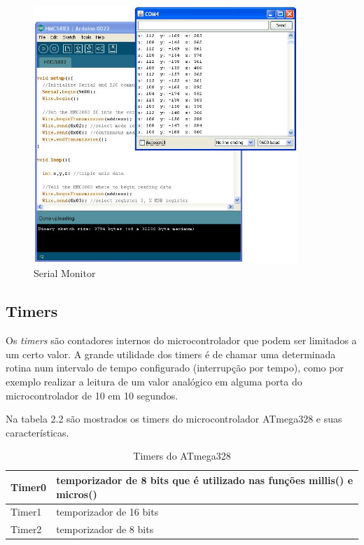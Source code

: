 \begin{figure}[h]

\center

\includegraphics[width=10cm]{imagens/serial_monitor.jpg}

\label{Serial Monitor}

\caption{Serial Monitor}

\end{figure}

\subsection{Timers}

Os \textit{timers} são contadores internos do microcontrolador que podem ser limitados a um certo valor. A grande utilidade dos timers é de chamar uma determinada rotina num intervalo de tempo configurado (interrupção por tempo), como por exemplo realizar a leitura de um valor analógico em alguma porta do microcontrolador de 10 em 10 segundos.

Na tabela 2.2 são mostrados os timers do microcontrolador ATmega328 e suas características.

\begin{table}[!hbt] 
   \centering   %
   \setlength{\arrayrulewidth}{1\arrayrulewidth}
   \setlength{\belowcaptionskip}{5pt}
   
   \caption{Timers do ATmega328}
   \begin{tabular}{l|l} %
   \hline
    Timer0 & temporizador de 8 bits que é utilizado nas funções          millis() e micros() \\
    \hline
    Timer1 & temporizador de 16 bits \\
    \hline
    Timer2 & temporizador de 8 bits\\
    \hline
   \end{tabular}
   \label{Timers do ATmega328}
\end{table}

